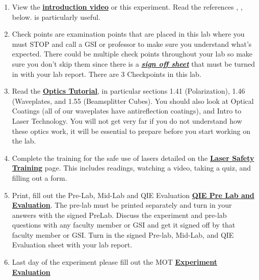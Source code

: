 \documentclass{../lab}
\begin{document}
\begin{enumerate}
    \item View the\textbf{ }\href{http://experimentationlab.berkeley.edu/sites/default/files/QIE/qie\_introduction\_final2.mp4}{\textbf{introduction video}} or this experiment. Read the references \cite{Dehlinger}, \cite{Bell}, \cite{Clauser} below. \cite{Dehlinger} is particularly useful.

    \item Check points are examination points that are placed in this lab where you must STOP and call a GSI or professor to make sure you understand what's expected. There could  be multiple check points throughout your lab so make sure you don't skip them since there is a \emph{\href{http://experimentationlab.berkeley.edu/qiecheckpoints}{\textbf{sign off sheet}}} that must be turned in with your lab report. There are 3 Checkpoints in this lab.

    \item Read the \href{http://experimentationlab.berkeley.edu/sites/default/files/QIE/fundamental-Optics.pdf}{\textbf{Optics Tutorial}}, in particular sections 1.41 (Polarization), 1.46 (Waveplates, and 1.55 (Beamsplitter Cubes). You should also look at Optical Coatings (all of our waveplates have antireflection coatings), and Intro to Laser Technology. You will not get very far if you do not understand how these optics work, it will be essential to prepare before you start working on the lab.

    \item Complete the training for the safe use of lasers detailed on the \href{http://experimentationlab.berkeley.edu/lasersafety}{\textbf{\textbf{Laser Safety Training}}} page. This includes readings, watching a video, taking a quiz, and filling out a form.

    \item Print, fill out the Pre-Lab, Mid-Lab and QIE Evaluation \href{http://experimentationlab.berkeley.edu/qieprelab}{\textbf{QIE Pre Lab and Evaluation}}. The pre-lab must be printed separately and turn in your answers with the signed PreLab. Discuss the experiment and pre-lab questions with any faculty member or GSI and get it signed off by that faculty member or GSI. Turn in the signed Pre-lab, Mid-Lab, and QIE Evaluation sheet with your lab report.

    \item Last day of the experiment please fill out the MOT  \href{\ExperimentEvaluation}{\textbf{Experiment Evaluation}}

\end{enumerate}
\end{document}
